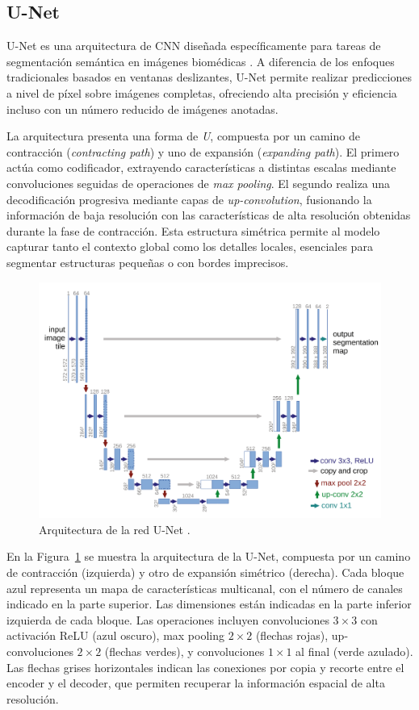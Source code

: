 \documentclass[../main.tex]{subfiles}
\begin{document}
\subsection{U-Net}
U-Net es una arquitectura de CNN diseñada específicamente para tareas de segmentación semántica en imágenes biomédicas \cite{ronneberger2015unet}. A diferencia de los enfoques tradicionales basados en ventanas deslizantes, U-Net permite realizar predicciones a nivel de píxel sobre imágenes completas, ofreciendo alta precisión y eficiencia incluso con un número reducido de imágenes anotadas.

La arquitectura presenta una forma de \textit{U}, compuesta por un camino de contracción (\textit{contracting path}) y uno de expansión (\textit{expanding path}). El primero actúa como codificador, extrayendo características a distintas escalas mediante convoluciones seguidas de operaciones de \textit{max pooling}. El segundo realiza una decodificación progresiva mediante capas de \textit{up-convolution}, fusionando la información de baja resolución con las características de alta resolución obtenidas durante la fase de contracción. Esta estructura simétrica permite al modelo capturar tanto el contexto global como los detalles locales, esenciales para segmentar estructuras pequeñas o con bordes imprecisos.

\begin{figure}
    \centering
    \includegraphics[width=\textwidth]{imgs/fundamentos/unet-estructura.png}
    \caption{Arquitectura de la red U-Net \cite{ronneberger2015unet}.}
    \label{fig:u-net-arquitectura}
\end{figure}

En la Figura~\ref{fig:u-net-arquitectura} se muestra la arquitectura de la U-Net, compuesta por un camino de contracción (izquierda) y otro de expansión simétrico (derecha). Cada bloque azul representa un mapa de características multicanal, con el número de canales indicado en la parte superior. Las dimensiones están indicadas en la parte inferior izquierda de cada bloque. Las operaciones incluyen convoluciones $3\times3$ con activación ReLU (azul oscuro), max pooling $2\times2$ (flechas rojas), up-convoluciones $2\times2$ (flechas verdes), y convoluciones $1\times1$ al final (verde azulado). Las flechas grises horizontales indican las conexiones por copia y recorte entre el encoder y el decoder, que permiten recuperar la información espacial de alta resolución.
\end{document}
